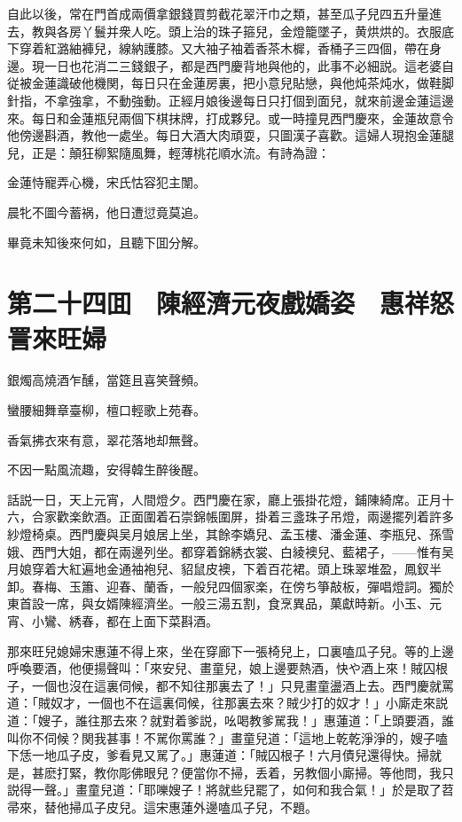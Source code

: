 自此以後，常在門首成兩價拿銀錢買剪截花翠汗巾之類，甚至瓜子兒四五升量進去，教與各房丫鬟并衆人吃。頭上治的珠子箍兒，金燈籠墜子，黄烘烘的。衣服底下穿着紅潞紬褲兒，線納護膝。又大袖子袖着香茶木樨，香桶子三四個，帶在身邊。現一日也花消二三錢銀子，都是西門慶背地與他的，此事不必細説。這老婆自従被金蓮識破他機関，每日只在金蓮房裏，把小意兒貼戀，與他炖茶炖水，做鞋脚針指，不拿強拿，不動強動。正經月娘後邊每日只打個到面兒，就來前邊金蓮這邊來。每日和金蓮瓶兒兩個下棋抹牌，打成夥兒。或一時撞見西門慶來，金蓮故意令他傍邊斟酒，教他一處坐。每日大酒大肉頑耍，只圖漢子喜歡。這婦人現抱金蓮腿兒，正是：顛狂柳絮隨風舞，輕薄桃花順水流。有詩為證：

金蓮恃寵弄心機，宋氏怙容犯主闈。

晨牝不圖今蓄祸，他日遭愆竟莫追。

畢竟未知後來何如，且聽下囬分解。

\chapter*{第二十四囬　陳經濟元夜戲嬌姿　惠祥怒詈來旺婦}

銀燭高燒酒乍醺，當筵且喜笑聲頻。

蠻腰細舞章臺柳，檀口輕歌上苑春。

香氣拂衣來有意，翠花落地却無聲。

不因一點風流趣，安得韓生醉後醒。

話説一日，天上元宵，人間燈夕。西門慶在家，廳上張掛花燈，鋪陳綺席。正月十六，合家歡楽飲酒。正面圍着石崇錦帳圍屏，掛着三盞珠子吊燈，兩邊擺列着許多紗燈椅桌。西門慶與吴月娘居上坐，其餘李嬌兒、孟玉樓、潘金蓮、李瓶兒、孫雪娥、西門大姐，都在兩邊列坐。都穿着錦綉衣裳、白綾襖兒、藍裙子，——惟有吴月娘穿着大紅遍地金通袖袍兒、貂鼠皮襖，下着百花裙。頭上珠翠堆盈，鳳釵半卸。春梅、玉簫、迎春、蘭香，一般兒四個家楽，在傍ち箏敲板，彈唱燈詞。獨於東首設一席，與女婿陳經濟坐。一般三湯五割，食烹異品，菓獻時新。小玉、元宵、小鸞、綉春，都在上面下菜斟酒。

那來旺兒媳婦宋惠蓮不得上來，坐在穿廊下一張椅兒上，口裏嗑瓜子兒。等的上邊呼喚要酒，他便揚聲叫：「來安兒、畫童兒，娘上邊要熱酒，快や酒上來！賊囚根子，一個也沒在這裏伺候，都不知往那裏去了！」只見畫童盪酒上去。西門慶就罵道：「賊奴才，一個也不在這裏伺候，往那裏去來？賊少打的奴才！」小廝走來説道：「嫂子，誰往那去來？就對着爹説，吆喝教爹駡我！」惠蓮道：「上頭要酒，誰叫你不伺候？関我甚事！不駡你罵誰？」畫童兒道：「這地上乾乾淨淨的，嫂子嗑下恁一地瓜子皮，爹看見又駡了。」惠蓮道：「賊囚根子！六月債兒還得快。掃就是，甚麽打緊，教你彫佛眼兒？便當你不掃，丢着，另教個小廝掃。等他問，我只説得一聲。」畫童兒道：「耶嚛嫂子！將就些兒罷了，如何和我合氣！」於是取了苕帚來，替他掃瓜子皮兒。這宋惠蓮外邊嗑瓜子兒，不題。

